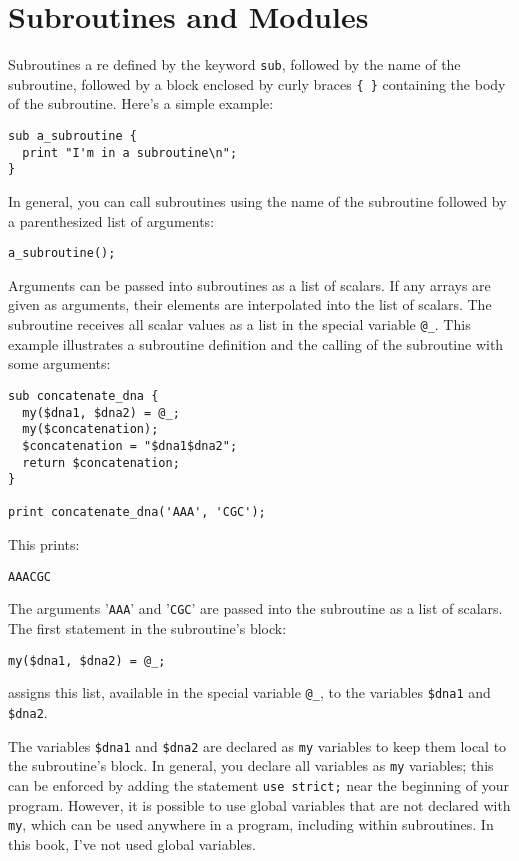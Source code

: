 \section{Subroutines and Modules}
Subroutines a re defined by the keyword \verb|sub|, followed by the name of the subroutine, followed by a block enclosed by curly braces \verb|{ }| containing the body of the subroutine. Here's a simple example:

\begin{lstlisting}
sub a_subroutine {
  print "I'm in a subroutine\n";
}
\end{lstlisting}

In general, you can call subroutines using the name of the subroutine followed by a parenthesized list of arguments:

\begin{lstlisting}
a_subroutine();
\end{lstlisting}

Arguments can be passed into subroutines as a list of scalars. If any arrays are given as arguments, their elements are interpolated into the list of scalars. The subroutine receives all scalar values as a list in the special variable \verb|@_|. This example illustrates a subroutine definition and the calling of the subroutine with some arguments: 

\begin{lstlisting}
sub concatenate_dna {
  my($dna1, $dna2) = @_;
  my($concatenation);
  $concatenation = "$dna1$dna2";
  return $concatenation;
}

print concatenate_dna('AAA', 'CGC');
\end{lstlisting}

This prints:

\begin{lstlisting}
AAACGC
\end{lstlisting}

The arguments '\verb|AAA|' and '\verb|CGC|' are passed into the subroutine as a list of scalars. The first statement in the subroutine's block:

\begin{lstlisting}
my($dna1, $dna2) = @_; 
\end{lstlisting}

assigns this list, available in the special variable \verb|@_|, to the variables \verb|$dna1| and \verb|$dna2|.

The variables \verb|$dna1| and \verb|$dna2| are declared as \verb|my| variables to keep them local to the subroutine's block. In general, you declare all variables as \verb|my| variables; this can be enforced by adding the statement \verb|use strict;| near the beginning of your program. However, it is possible to use global variables that are not declared with \verb|my|, which can be used anywhere in a program, including within subroutines. In this book, I've not used global variables.

